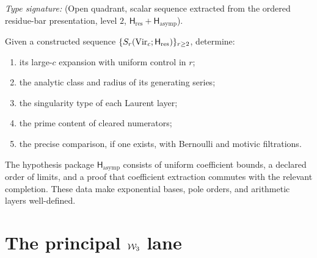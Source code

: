 \begin{problem}
\ClaimStatusOpen
\label{prop:sth-leading-asymp}
\label{thm:shadow-exponential-base-Virasoro}
\label{thm:universal-class-M-C-is-6}
\label{thm:shadow-series-closed-form-Virasoro}
\label{thm:shadow-series-closed-form-Virasoro-subleading}
\label{thm:pole-doubling-all-k}
\label{prop:phi-k-leading-coefficient-arithmetic}
\label{prop:C-A-inverse-radius}
\label{thm:s-r-kummer-absent-through-r-11}
\label{thm:shadow-tower-asymptotic-closed-form}
\label{thm:shadow-tower-subleading-closed-form}
\label{thm:shadow-tower-sub-subleading-closed-form-inline}
\label{thm:shadow-tower-tier-4-closed-form}
\label{thm:kummer-laurent-depth-controlled}
\label{thm:s-r-rational-denominator-pattern}
\label{cor:arithmetic-uniformity-class-M}
\label{cor:bernoulli-leading-duality-sharpness}
\label{cor:kummer-emergence-at-r-8}
\label{cor:subleading-characteristic-primes}
\label{cor:tier-3-characteristic-primes}
\label{cor:universal-class-M-subleading-uniformity}
\label{cor:virasoro-23-smoothness}
\label{cor:virasoro-motivic-purity-r-leq-11}
\emph{Type signature:}
\textup{(Open quadrant, scalar sequence extracted from the ordered
residue-bar presentation, level \(2\),
\(\mathsf H_{\mathrm{res}}+\mathsf H_{\mathrm{asymp}}\)).}

Given a constructed sequence
$\{S_r(\mathrm{Vir}_c;\mathsf H_{\mathrm{res}})\}_{r\ge2}$, determine:

\begin{enumerate}[label=\textup{(\roman*)}]
\item its large-$c$ expansion with uniform control in $r$;
\item the analytic class and radius of its generating series;
\item the singularity type of each Laurent layer;
\item the prime content of cleared numerators;
\item the precise comparison, if one exists, with Bernoulli and
motivic filtrations.
\end{enumerate}

The hypothesis package $\mathsf H_{\mathrm{asymp}}$ consists of
uniform coefficient bounds, a declared order of limits, and a proof
that coefficient extraction commutes with the relevant completion.
These data make exponential bases, pole orders, and arithmetic layers
well-defined.
\end{problem}

\section{The principal \texorpdfstring{$\mathcal W_3$}{W3} lane}
\label{subsec:w3-wline-closed-form}

